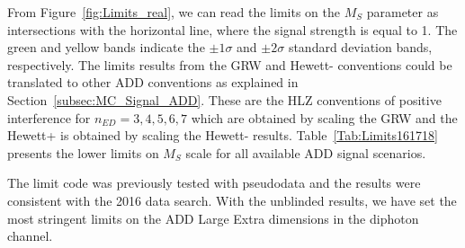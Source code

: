 From Figure~\ref{fig:Limits_real}, we can read the limits on the $M_S$ parameter as intersections with the horizontal line, where the signal strength is equal to 1. The green and yellow bands indicate the $\pm1\sigma$ and $\pm2\sigma$ standard deviation bands, respectively. The limits results from the GRW and Hewett- conventions could be translated to other ADD conventions as explained in Section~\ref{subsec:MC_Signal_ADD}. These are the HLZ conventions of positive interference for $n_{ED}=3,4,5,6,7$ which are obtained by scaling the GRW and the Hewett+ is obtained by scaling the Hewett- results. Table~\ref{Tab:Limits161718} presents the lower limits on $M_S$ scale for all available ADD signal scenarios.
\begin{table}[pt]
    \centering
    \caption{Exclusion limits on the mass scale \Ms (in units of {\TeVns}) for various conventions used in the calculation of the ADD large extra-dimensional scenario using the 2016-2018 CMS detector data corresponding to an integrated luminosity of 138 \fbinv. The total asymmetric uncertainties are shown on the expected limits.}
    \label{Tab:Limits161718}
\end{table}
The limit code was previously tested with pseudodata and the results were consistent with the 2016 data search. With the unblinded results, we have set the most stringent limits on the ADD Large Extra dimensions in the diphoton channel.

